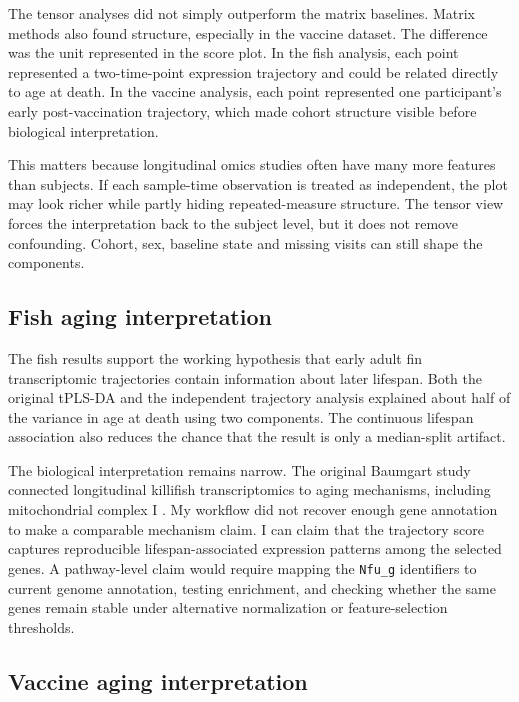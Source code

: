 \documentclass[11pt,a4paper]{article}
\begin{document}
The tensor analyses did not simply outperform the matrix baselines. Matrix methods also found structure, especially in the vaccine dataset. The difference was the unit represented in the score plot. In the fish analysis, each point represented a two-time-point expression trajectory and could be related directly to age at death. In the vaccine analysis, each point represented one participant's early post-vaccination trajectory, which made cohort structure visible before biological interpretation.

This matters because longitudinal omics studies often have many more features than subjects. If each sample-time observation is treated as independent, the plot may look richer while partly hiding repeated-measure structure. The tensor view forces the interpretation back to the subject level, but it does not remove confounding. Cohort, sex, baseline state and missing visits can still shape the components.

\subsection{Fish aging interpretation}

The fish results support the working hypothesis that early adult fin transcriptomic trajectories contain information about later lifespan. Both the original tPLS-DA and the independent trajectory analysis explained about half of the variance in age at death using two components. The continuous lifespan association also reduces the chance that the result is only a median-split artifact.

The biological interpretation remains narrow. The original Baumgart study connected longitudinal killifish transcriptomics to aging mechanisms, including mitochondrial complex I \citep{baumgart2016killifish}. My workflow did not recover enough gene annotation to make a comparable mechanism claim. I can claim that the trajectory score captures reproducible lifespan-associated expression patterns among the selected genes. A pathway-level claim would require mapping the \texttt{Nfu\_g} identifiers to current genome annotation, testing enrichment, and checking whether the same genes remain stable under alternative normalization or feature-selection thresholds.

\subsection{Vaccine aging interpretation}
\end{document}
